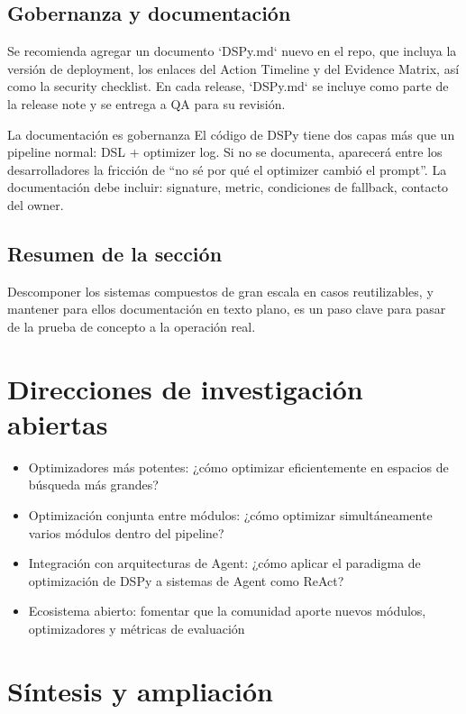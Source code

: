 \documentclass[a4paper]{article}
\begin{document}
\subsection{Gobernanza y documentación}

Se recomienda agregar un documento `DSPy.md` nuevo en el repo, que incluya la versión de deployment, los enlaces del Action Timeline y del Evidence Matrix, así como la security checklist. En cada release, `DSPy.md` se incluye como parte de la release note y se entrega a QA para su revisión.

\begin{importantbox}{La documentación es gobernanza}
El código de DSPy tiene dos capas más que un pipeline normal: DSL + optimizer log. Si no se documenta, aparecerá entre los desarrolladores la fricción de ``no sé por qué el optimizer cambió el prompt''. La documentación debe incluir: signature, metric, condiciones de fallback, contacto del owner.
\end{importantbox}

\subsection{Resumen de la sección}

Descomponer los sistemas compuestos de gran escala en casos reutilizables, y mantener para ellos documentación en texto plano, es un paso clave para pasar de la prueba de concepto a la operación real.

\section{Direcciones de investigación abiertas}

\begin{itemize}
    \item Optimizadores más potentes: ¿cómo optimizar eficientemente en espacios de búsqueda más grandes?
    \item Optimización conjunta entre módulos: ¿cómo optimizar simultáneamente varios módulos dentro del pipeline?
    \item Integración con arquitecturas de Agent: ¿cómo aplicar el paradigma de optimización de DSPy a sistemas de Agent como ReAct?
    \item Ecosistema abierto: fomentar que la comunidad aporte nuevos módulos, optimizadores y métricas de evaluación
\end{itemize}

\section{Síntesis y ampliación}
\end{document}
